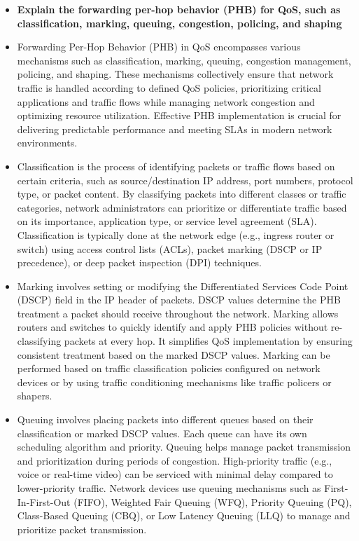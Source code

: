 \documentclass{article}
\begin{document}
\begin{itemize}
  \item \textbf{Explain the forwarding per-hop behavior (PHB) for QoS, such as classification, marking, queuing, congestion, policing, and shaping}
  	\item[] Forwarding Per-Hop Behavior (PHB) in QoS encompasses various mechanisms such as classification, marking, queuing, congestion management, policing, and shaping. These mechanisms collectively ensure that network traffic is handled according to defined QoS policies, prioritizing critical applications and traffic flows while managing network congestion and optimizing resource utilization. Effective PHB implementation is crucial for delivering predictable performance and meeting SLAs in modern network environments.
	\item[] Classification is the process of identifying packets or traffic flows based on certain criteria, such as source/destination IP address, port numbers, protocol type, or packet content. By classifying packets into different classes or traffic categories, network administrators can prioritize or differentiate traffic based on its importance, application type, or service level agreement (SLA). Classification is typically done at the network edge (e.g., ingress router or switch) using access control lists (ACLs), packet marking (DSCP or IP precedence), or deep packet inspection (DPI) techniques.
	\item[] Marking involves setting or modifying the Differentiated Services Code Point (DSCP) field in the IP header of packets. DSCP values determine the PHB treatment a packet should receive throughout the network. Marking allows routers and switches to quickly identify and apply PHB policies without re-classifying packets at every hop. It simplifies QoS implementation by ensuring consistent treatment based on the marked DSCP values. Marking can be performed based on traffic classification policies configured on network devices or by using traffic conditioning mechanisms like traffic policers or shapers.
	\item[] Queuing involves placing packets into different queues based on their classification or marked DSCP values. Each queue can have its own scheduling algorithm and priority. Queuing helps manage packet transmission and prioritization during periods of congestion. High-priority traffic (e.g., voice or real-time video) can be serviced with minimal delay compared to lower-priority traffic. Network devices use queuing mechanisms such as First-In-First-Out (FIFO), Weighted Fair Queuing (WFQ), Priority Queuing (PQ), Class-Based Queuing (CBQ), or Low Latency Queuing (LLQ) to manage and prioritize packet transmission.

\end{itemize}
\end{document}

